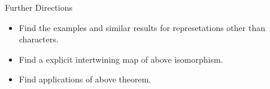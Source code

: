 \documentclass[final,hyperref={pdfpagelabels=false}]{beamer} %
\begin{document}
\begin{frame}
\begin{columns}[t]
\begin{column}{.48\linewidth}
     \begin{block}{Further Directions}
         \begin{itemize}
           \item  Find the examples and similar results 
             for represetations other than characters.
           \item Find a explicit intertwining map of above isomorphism.
           \item Find applications of above theorem.
         \end{itemize}
     \end{block}

     
%         
   \end{column}
 \end{columns}
\end{frame}
\end{document}
